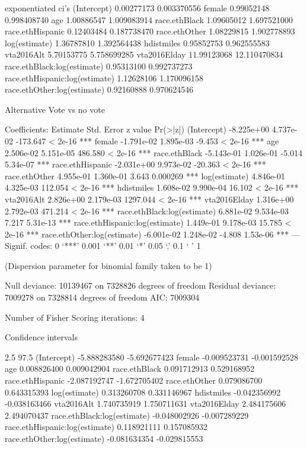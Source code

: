 exponentiated ci's
(Intercept)                     0.00277173  0.003370556
female                          0.99052148  0.998408740
age                             1.00886547  1.009083914
race.ethBlack                   1.09605012  1.697521000
race.ethHispanic                0.12403484  0.187738470
race.ethOther                   1.08229815  1.902778893
log(estimate)                   1.36787810  1.392564438
hdistmiles                      0.95852753  0.962555583
vta2016Alt                      5.70153775  5.758699285
vta2016Elday                   11.99123068 12.110470834
race.ethBlack:log(estimate)     0.95313100  0.992737273
race.ethHispanic:log(estimate)  1.12628106  1.170096158
race.ethOther:log(estimate)     0.92160888  0.970624546


Alternative Vote vs no vote

Coefficients:
                                 Estimate Std. Error  z value Pr(>|z|)
(Intercept)                    -8.225e+00  4.737e-02 -173.647  < 2e-16 ***
female                         -1.791e-02  1.895e-03   -9.453  < 2e-16 ***
age                             2.506e-02  5.151e-05  486.580  < 2e-16 ***
race.ethBlack                  -5.143e-01  1.026e-01   -5.014 5.34e-07 ***
race.ethHispanic               -2.031e+00  9.973e-02  -20.363  < 2e-16 ***
race.ethOther                   4.955e-01  1.360e-01    3.643 0.000269 ***
log(estimate)                   4.846e-01  4.325e-03  112.054  < 2e-16 ***
hdistmiles                      1.608e-02  9.990e-04   16.102  < 2e-16 ***
vta2016Alt                      2.826e+00  2.179e-03 1297.044  < 2e-16 ***
vta2016Elday                    1.316e+00  2.792e-03  471.214  < 2e-16 ***
race.ethBlack:log(estimate)     6.881e-02  9.534e-03    7.217 5.31e-13 ***
race.ethHispanic:log(estimate)  1.449e-01  9.178e-03   15.785  < 2e-16 ***
race.ethOther:log(estimate)    -6.001e-02  1.248e-02   -4.808 1.53e-06 ***
---
Signif. codes:  0 ‘***’ 0.001 ‘**’ 0.01 ‘*’ 0.05 ‘.’ 0.1 ‘ ’ 1

(Dispersion parameter for binomial family taken to be 1)

    Null deviance: 10139467  on 7328826  degrees of freedom
Residual deviance:  7009278  on 7328814  degrees of freedom
AIC: 7009304

Number of Fisher Scoring iterations: 4


Confidence intervals

                                    2.5        97.5 %
(Intercept)                    -5.888283580 -5.692677423
female                         -0.009523731 -0.001592528
age                             0.008826400  0.009042904
race.ethBlack                   0.091712913  0.529168952
race.ethHispanic               -2.087192747 -1.672705402
race.ethOther                   0.079086700  0.643315393
log(estimate)                   0.313260708  0.331146967
hdistmiles                     -0.042356992 -0.038163466
vta2016Alt                      1.740735919  1.750711631
vta2016Elday                    2.484175606  2.494070437
race.ethBlack:log(estimate)    -0.048002926 -0.007289229
race.ethHispanic:log(estimate)  0.118921111  0.157085932
race.ethOther:log(estimate)    -0.081634354 -0.029815553

